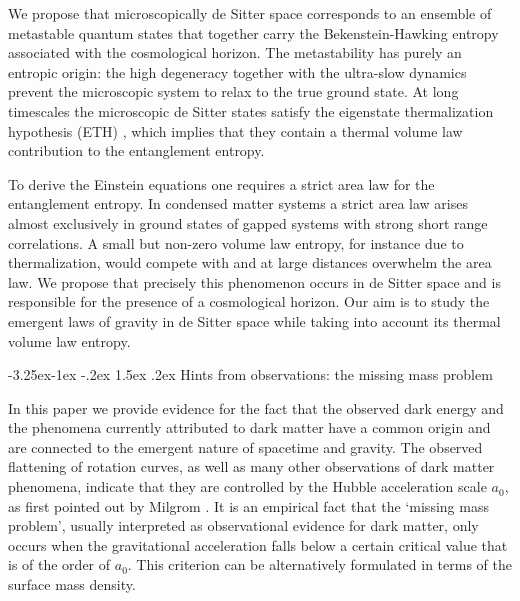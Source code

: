 \documentclass[a4paper,12pt]{article}
\makeatletter
\renewcommand\subsection{\@startsection{subsection}{2}{\z@}%
                                     {-3.25ex\@plus -1ex \@minus -.2ex}%
                                     {1.5ex \@plus .2ex}%
                                     {\normalfont\bfseries}}
\makeatother
\begin{document}
 We propose that microscopically de Sitter space corresponds to an ensemble of  metastable quantum states that together carry the Bekenstein-Hawking entropy associated with the cosmological horizon. %
The metastability has purely an entropic origin: the high degeneracy together with the ultra-slow 
dynamics prevent the microscopic system to relax to the true ground state. At long timescales the microscopic de Sitter states satisfy the eigenstate thermalization hypothesis  (ETH) \cite{ETH1,ETH2}, which implies that they contain a thermal volume law contribution to the entanglement entropy.   
 
To derive the Einstein equations one requires a strict area law for the
entanglement entropy.  In condensed matter systems a strict area law arises almost exclusively 
in ground states of gapped systems with strong short range correlations. A small but non-zero volume law entropy, for instance due to thermalization, would compete with and at large 
distances overwhelm the area law. We propose that precisely this phenomenon occurs in de Sitter space and is responsible for the presence of a cosmological horizon. Our aim is to study the emergent laws of gravity in de Sitter space while taking into account its thermal volume law entropy. 
 
 

\subsection{Hints from observations: the missing mass problem}


In this paper we provide evidence for the fact that the observed dark energy %
and the phenomena currently attributed to dark matter have a common origin and are 
connected to the emergent nature of spacetime and gravity. 
The observed 
flattening of rotation curves, as well as many other observations of dark matter phenomena, 
indicate that they are controlled 
by the Hubble acceleration scale $a_0$, as first pointed out by Milgrom \cite{Milgrom:1983}.  It is an 
empirical fact \cite{BekensteinMilgrom, Milgrom, Sanders} that the `missing mass problem', usually interpreted as observational evidence for dark matter,  only occurs when the 
gravitational acceleration %
falls below a certain critical value that is of the order of $a_0$.   This criterion can be alternatively formulated in terms of the surface mass density. 
\end{document}

